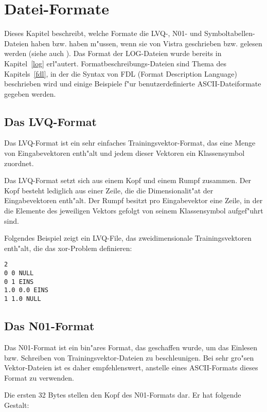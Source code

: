 \section{Datei-Formate}
\label{formate}

Dieses Kapitel beschreibt, welche Formate die LVQ-, N01- und 
Symboltabellen-Dateien haben bzw. haben
m"ussen, wenn sie von Vistra geschrieben bzw. gelesen werden
(siehe auch \cite{bayer}).
Das Format der LOG-Dateien wurde bereits in Kapitel~\ref{log} erl"autert.
Formatbeschreibungs-Dateien sind Thema des Kapitels~\ref{fdl}, 
in der die Syntax von FDL (Format Description Language) beschrieben
wird und einige Beispiele f"ur benutzerdefinierte ASCII-Dateiformate
gegeben werden.

\subsection{Das LVQ-Format}
\label{lvq}

Das LVQ-Format ist ein sehr einfaches Trainingsvektor-Format, das eine Menge von
Eingabevektoren enth"alt und jedem dieser Vektoren ein Klassensymbol
zuordnet.

Das LVQ-Format setzt sich aus einem Kopf und einem Rumpf zusammen.
Der Kopf besteht lediglich aus einer Zeile, die die Dimensionalit"at der
Eingabevektoren enth"alt.
Der Rumpf besitzt pro Eingabevektor eine Zeile, in der die Elemente
des jeweiligen Vektors gefolgt von seinem Klassensymbol aufgef"uhrt sind.

Folgendes Beispiel zeigt ein LVQ-File, das zweidimensionale
Trainingsvektoren enth"alt, die das xor-Problem definieren:

\nopagebreak
\begin{verbatim}
2
0 0 NULL
0 1 EINS
1.0 0.0 EINS
1 1.0 NULL
\end{verbatim}
   
\subsection{Das N01-Format}
\label{n01}
Das N01-Format ist ein bin"ares Format, das geschaffen wurde, um das
Einlesen bzw. Schreiben von Trainingsvektor-Dateien zu beschleunigen.
Bei sehr gro"sen Vektor-Dateien ist es daher empfehlenswert, 
anstelle eines ASCII-Formats dieses Format zu verwenden.

Die ersten 32 Bytes stellen den Kopf des N01-Formats dar.
Er hat folgende Gestalt:

